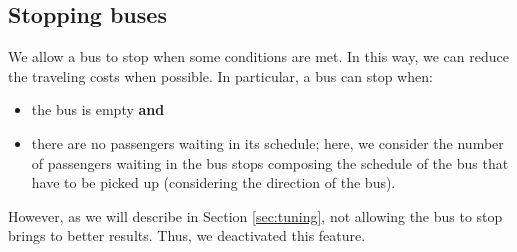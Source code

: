 \subsection{Stopping buses}
\label{sec:stop}

We allow a bus to stop when some conditions are met. In this way, we can reduce the traveling costs when possible. In particular, a bus can stop when:

\begin{itemize}
\item the bus is empty \textbf{and}
\item there are no passengers waiting in its schedule; here, we consider the number of passengers waiting in the bus stops composing the schedule of the bus that have to be picked up (considering the direction of the bus).
\end{itemize}

However, as we will describe in Section \ref{sec:tuning}, not allowing the bus to stop brings to better results. Thus, we deactivated this feature.
